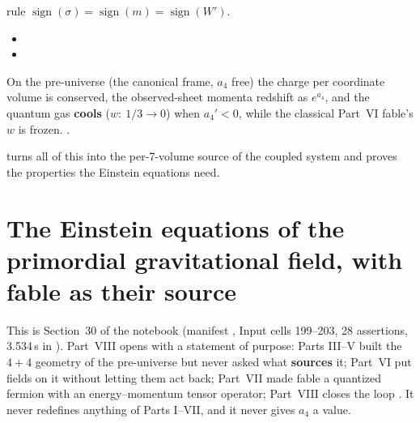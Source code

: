rule $\operatorname{sign}(\sigma)=\operatorname{sign}(m)=\operatorname{sign}(W')$. 
\begin{itemize}
  \item {}
  \item {}
\end{itemize}
On the pre-universe (the canonical frame, $a_4$ free) the charge per coordinate volume is conserved, the
observed-sheet momenta redshift as $e^{a_4}$, and the quantum gas \textbf{cools} ($w:\ 1/3\to0$) when
$a_4'<0$, while the classical Part~VI fable's $w$ is frozen. 
.

 turns all of this into the per-7-volume source of the coupled system and proves the
properties the Einstein equations need.

\section{The Einstein equations of the primordial gravitational field, with fable as their source}
\label{sec:4}

This is Section~30 of the notebook (manifest , Input cells 199--203,
28 assertions, 3.534\,s in ). Part~VIII opens with a
statement of purpose: Parts III--V built the $4+4$ geometry of the pre-universe but never asked what
\textbf{sources} it; Part~VI put fields on it without letting them act back; Part~VII made fable a
quantized fermion with an energy--momentum tensor operator; Part~VIII closes the loop
. It never redefines anything of Parts I--VII, and it never gives $a_4$ a
value.


